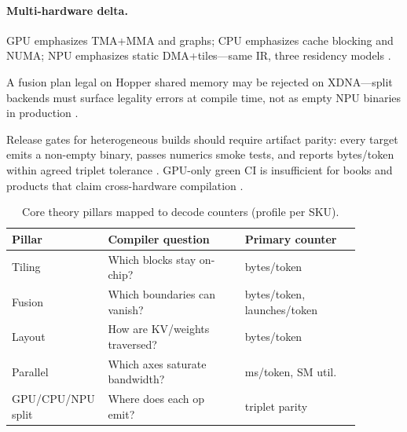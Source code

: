 \paragraph{Multi-hardware delta.} GPU emphasizes TMA+MMA and graphs; CPU emphasizes cache blocking and NUMA; NPU emphasizes static DMA+tiles---same IR, three residency models \citep{nvidia2022hopper,amd2024xdna,dlbook,yirage2026,chen2020compilerbasedhardw,patel2025llminference,taxbreak2026,memoryfloor2026,kwon2023vllm,liu2024deepseekv3,dao2022flashattention,semianalysis2024tma,dao2023flashdecoding,nvidia2024cudagraphs,amd2024aie}.

\begin{example}
A fusion plan legal on Hopper shared memory may be rejected on XDNA---split backends must surface legality errors at compile time, not as empty NPU binaries in production \citep{yirage2026,amd2024xdna,amd2024aie,chen2020compilerbasedhardw,patel2025llminference,taxbreak2026,memoryfloor2026,dlbook,kwon2023vllm,liu2024deepseekv3,dao2022flashattention,semianalysis2024tma,dao2023flashdecoding,nvidia2022hopper,nvidia2024cudagraphs}.
\end{example}

Release gates for heterogeneous builds should require artifact parity: every target emits a non-empty binary, passes numerics smoke tests, and reports bytes/token within agreed triplet tolerance \citep{yirage2026,chen2020compilerbasedhardw,patel2025llminference,amd2024xdna,amd2024aie,taxbreak2026,memoryfloor2026,dlbook,kwon2023vllm,liu2024deepseekv3,dao2022flashattention,semianalysis2024tma,dao2023flashdecoding,nvidia2022hopper,nvidia2024cudagraphs}. GPU-only green CI is insufficient for books and products that claim cross-hardware compilation \citep{patel2025llminference,yirage2026,chen2020compilerbasedhardw,amd2024aie,amd2024xdna,dlbook}.

\begin{table}[t]
\centering
\caption{Core theory pillars mapped to decode counters (profile per SKU).}
\label{tab:ch13_pillars}
\begin{tabular}{p{0.18\linewidth}p{0.38\linewidth}p{0.32\linewidth}}
\toprule
\textbf{Pillar} & \textbf{Compiler question} & \textbf{Primary counter} \\
\midrule
Tiling & Which blocks stay on-chip? & bytes/token \\
Fusion & Which boundaries can vanish? & bytes/token, launches/token \\
Layout & How are KV/weights traversed? & bytes/token \\
Parallel & Which axes saturate bandwidth? & ms/token, SM util. \\
GPU/CPU/NPU split & Where does each op emit? & triplet parity \\
\bottomrule
\end{tabular}
\end{table}

